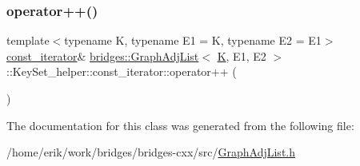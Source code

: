 \mbox{\label{classbridges_1_1_graph_adj_list_1_1_key_set__helper_1_1const__iterator_a9fa08ff89640b3347c15a3858664cfdc}} 
\subsubsection{\texorpdfstring{operator++()}{operator++()}}
{\footnotesize\ttfamily template$<$typename K, typename E1 = K, typename E2 = E1$>$ \\
\hyperlink{classbridges_1_1_graph_adj_list_1_1_key_set__helper_1_1const__iterator}{const\+\_\+iterator}\& \hyperlink{classbridges_1_1_graph_adj_list}{bridges\+::\+Graph\+Adj\+List}$<$ \hyperlink{namespacebridges_acfb0a4f7877d8f63de3e6862004c50edaa5f3c6a11b03839d46af9fb43c97c188}{K}, E1, E2 $>$\+::Key\+Set\+\_\+helper\+::const\+\_\+iterator\+::operator++ (\begin{DoxyParamCaption}{ }\end{DoxyParamCaption})\hspace{0.3cm}{\ttfamily [inline]}}



The documentation for this class was generated from the following file\+:\begin{DoxyCompactItemize}
\item 
/home/erik/work/bridges/bridges-\/cxx/src/\hyperlink{_graph_adj_list_8h}{Graph\+Adj\+List.\+h}\end{DoxyCompactItemize}
